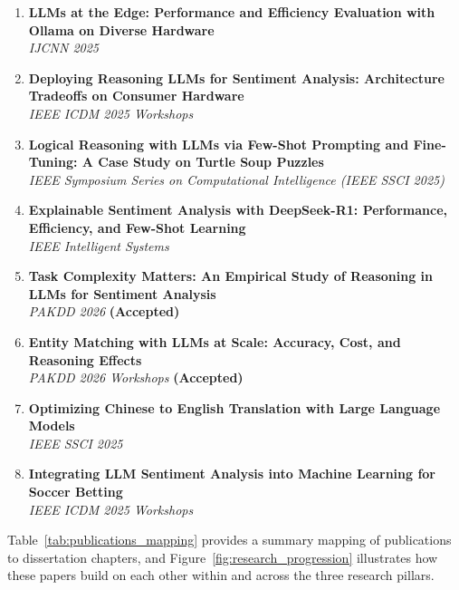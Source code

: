 \begin{enumerate}[leftmargin=*,resume]
    \item \textbf{LLMs at the Edge: Performance and Efficiency Evaluation with Ollama on Diverse Hardware}~\cite{huang2025edge}\\
    \textit{IJCNN 2025}
    
    \item \textbf{Deploying Reasoning LLMs for Sentiment Analysis: Architecture Tradeoffs on Consumer Hardware}~\cite{huang2025reasoning_deployment}\\
    \textit{IEEE ICDM 2025 Workshops}
    
    \item \textbf{Logical Reasoning with LLMs via Few-Shot Prompting and Fine-Tuning: A Case Study on Turtle Soup Puzzles}~\cite{huang2025logical}\\
    \textit{IEEE Symposium Series on Computational Intelligence (IEEE SSCI 2025)}
    
    \item \textbf{Explainable Sentiment Analysis with DeepSeek-R1: Performance, Efficiency, and Few-Shot Learning}~\cite{huang2025deepseek}\\
    \textit{IEEE Intelligent Systems}
    
    \item \textbf{Task Complexity Matters: An Empirical Study of Reasoning in LLMs for Sentiment Analysis}~\cite{huang2026complexity}\\
    \textit{PAKDD 2026} \textbf{(Accepted)}

    \item \textbf{Entity Matching with LLMs at Scale: Accuracy, Cost, and Reasoning Effects}~\cite{huang2026entity}\\
    \textit{PAKDD 2026 Workshops} \textbf{(Accepted)}
    
    \item \textbf{Optimizing Chinese to English Translation with Large Language Models}~\cite{huang2025translation}\\
    \textit{IEEE SSCI 2025}
    
    \item \textbf{Integrating LLM Sentiment Analysis into Machine Learning for Soccer Betting}~\cite{samuel2025soccer}\\
    \textit{IEEE ICDM 2025 Workshops}
\end{enumerate}

Table~\ref{tab:publications_mapping} provides a summary mapping of publications to dissertation chapters, and Figure~\ref{fig:research_progression} illustrates how these papers build on each other within and across the three research pillars.

